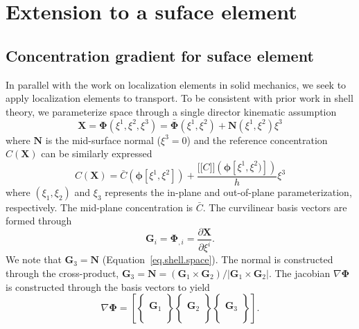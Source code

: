 \documentclass[10pt]{elsarticle}
\newcommand{\mbs}[1]{\boldsymbol{#1}}
\def\ljump{\lbrack\!\lbrack}
\def\rjump{\rbrack\!\rbrack}
\def\bs{{\mbs{s}}} \def\bt{{\mbs{t}}} \def\bu{{\mbs{u}}}
\def\bPhi{{\mbs{\Phi}}}
\def\bs{\boldsymbol}
\begin{document}
\section{Extension to a suface element}
\label{section.extension}


\subsection{Concentration gradient for suface element}
In parallel with the work on localization elements in solid mechanics, we seek to apply localization elements to transport.  To be consistent with prior work in shell theory, we parameterize space through a single director kinematic assumption \cite{Simo1989,Fox1990}
\begin{equation}
\label{eq.shell.space} \bs{X} = \bPhi(\xi^{1},\xi^{2},\xi^{3}) =  \bar{\bs{\Phi}}(\xi^{1},\xi^{2}) + \bs{N}(\xi^{1},\xi^{2})\xi^{3}
\end{equation}
where $\bs{N}$ is the mid-surface normal ($\xi^{3} = 0$) and the reference concentration $C(\bs{X})$ can be similarly expressed
\begin{equation}
\label{eq.shell.concentration} C(\bs{X})  = \bar{C}(\bs{\phi}[\xi^{1},\xi^{2}] )+   \frac{\ljump C \rjump (\bs{\phi}[\xi^{1},\xi^{2})]) }{h} \xi^{3}
\end{equation}
where $(\xi_{1},\xi_{2})$  and $\xi_{3}$ represents the in-plane and out-of-plane parameterization, respectively. The mid-plane concentration is $\bar{C}$. The curvilinear basis vectors are formed through
\begin{equation}
\label{eq.basis.vectors} \bs{G}_{i} = \bPhi_{,i} = \frac{\partial \bs{X}}{\partial \xi^{i}}.
\end{equation}
We note that $\bs{G}_{3} = \bs{N}$ (Equation~\ref{eq.shell.space}). The normal is constructed through the cross-product, $\bs{G}_{3} = \bs{N} = (\bs{G}_{1} \times \bs{G}_{2}) / | \bs{G}_{1} \times \bs{G}_{2}|$. The jacobian $\nabla \bPhi$  is constructed through the basis vectors to yield
\begin{equation}
\label{eq.basis.jacobian}\nabla \bPhi = 
\left[ \left\{
\begin{matrix} 
 \\ 
\bs{G}_{1}  \\
 \\
 \end{matrix}
 \right\}
 \left\{
 \begin{matrix} 
 \\ 
\bs{G}_{2}  \\
 \\
 \end{matrix}
 \right\}
 \left\{
 \begin{matrix} 
 \\ 
\bs{G}_{3}  \\
 \\
 \end{matrix}
 \right\} 
\right].
\end{equation}
\end{document}
